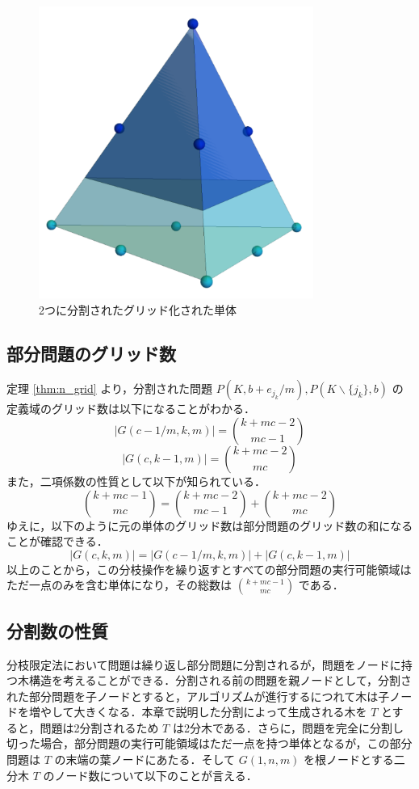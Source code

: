 \documentclass[a4paper,11pt]{jreport}
\begin{document}
\begin{figure}
\begin{center}
\includegraphics[width=9cm]{graphs/divided_simplices.pdf}
\caption{2つに分割されたグリッド化された単体}
\label{fig:divided_simplices}
\end{center}
\end{figure}

\subsection{部分問題のグリッド数}

定理 \ref{thm:n_grid} より，分割された問題 $ P(K, b + e_{j_k} / m), P(K \backslash \{ j_k \}, b) $ の定義域のグリッド数は以下になることがわかる．
$$ | G(c - 1/m, k, m) | = \binom{k + mc - 2}{mc - 1} $$
$$ | G(c, k - 1, m) | = \binom{k + mc - 2}{mc} $$
また，二項係数の性質として以下が知られている．
$$ \binom{k + mc - 1}{mc} = \binom{k + mc - 2}{mc - 1} + \binom{k + mc - 2}{mc} $$
ゆえに，以下のように元の単体のグリッド数は部分問題のグリッド数の和になることが確認できる．
$$ | G(c, k, m) | = | G(c - 1/m, k, m) | + | G(c, k - 1, m) | $$
以上のことから，この分枝操作を繰り返すとすべての部分問題の実行可能領域はただ一点のみを含む単体になり，その総数は $ \binom{k + mc - 1}{mc} $ である．\par

\subsection{分割数の性質} \label{sec:number_of_partition}

分枝限定法において問題は繰り返し部分問題に分割されるが，問題をノードに持つ木構造を考えることができる．分割される前の問題を親ノードとして，分割された部分問題を子ノードとすると，アルゴリズムが進行するにつれて木は子ノードを増やして大きくなる．本章で説明した分割によって生成される木を $ T $ とすると，問題は2分割されるため $ T $ は2分木である．さらに，問題を完全に分割し切った場合，部分問題の実行可能領域はただ一点を持つ単体となるが，この部分問題は $ T $ の末端の葉ノードにあたる．そして $ G(1, n, m) $ を根ノードとする二分木 $ T $ のノード数について以下のことが言える．
\end{document}
